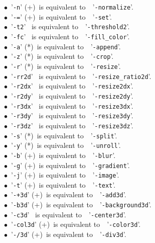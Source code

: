 \documentclass[a4paper,11pt,twoside]{book}
\begin{document}
$\bullet$~'\texttt{-n}' (+)~is equivalent to~~'\texttt{-normalize}'.\\
$\bullet$~'\texttt{-=}' (+)~is equivalent to~~'\texttt{-set}'.\\
$\bullet$~'\texttt{-t2}' ~is equivalent to~~'\texttt{-threshold2}'.\\
$\bullet$~'\texttt{-fc}' ~is equivalent to~~'\texttt{-fill\_color}'.\\
$\bullet$~'\texttt{-a}' (*)~is equivalent to~~'\texttt{-append}'.\\
$\bullet$~'\texttt{-z}' (*)~is equivalent to~~'\texttt{-crop}'.\\
$\bullet$~'\texttt{-r}' (*)~is equivalent to~~'\texttt{-resize}'.\\
$\bullet$~'\texttt{-rr2d}' ~is equivalent to~~'\texttt{-resize\_ratio2d}'.\\
$\bullet$~'\texttt{-r2dx}' ~is equivalent to~~'\texttt{-resize2dx}'.\\
$\bullet$~'\texttt{-r2dy}' ~is equivalent to~~'\texttt{-resize2dy}'.\\
$\bullet$~'\texttt{-r3dx}' ~is equivalent to~~'\texttt{-resize3dx}'.\\
$\bullet$~'\texttt{-r3dy}' ~is equivalent to~~'\texttt{-resize3dy}'.\\
$\bullet$~'\texttt{-r3dz}' ~is equivalent to~~'\texttt{-resize3dz}'.\\
$\bullet$~'\texttt{-s}' (*)~is equivalent to~~'\texttt{-split}'.\\
$\bullet$~'\texttt{-y}' (*)~is equivalent to~~'\texttt{-unroll}'.\\
$\bullet$~'\texttt{-b}' (+)~is equivalent to~~'\texttt{-blur}'.\\
$\bullet$~'\texttt{-g}' (+)~is equivalent to~~'\texttt{-gradient}'.\\
$\bullet$~'\texttt{-j}' (+)~is equivalent to~~'\texttt{-image}'.\\
$\bullet$~'\texttt{-t}' (+)~is equivalent to~~'\texttt{-text}'.\\
$\bullet$~'\texttt{-+3d}' (+)~is equivalent to~~'\texttt{-add3d}'.\\
$\bullet$~'\texttt{-b3d}' (+)~is equivalent to~~'\texttt{-background3d}'.\\
$\bullet$~'\texttt{-c3d}' ~is equivalent to~~'\texttt{-center3d}'.\\
$\bullet$~'\texttt{-col3d}' (+)~is equivalent to~~'\texttt{-color3d}'.\\
$\bullet$~'\texttt{-/3d}' (+)~is equivalent to~~'\texttt{-div3d}'.\\
\end{document}
